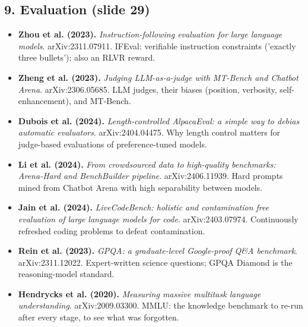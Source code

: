 \documentclass[11pt,letterpaper]{article}
\begin{document}
\subsection*{9. Evaluation (slide 29)}
\begin{itemize}[leftmargin=1.2em,itemsep=3pt]\sloppy
\item \textbf{Zhou et al. (2023).} \textit{Instruction-following evaluation for large language models}. arXiv:2311.07911. IFEval: verifiable instruction constraints ('exactly three bullets'); also an RLVR reward.
\item \textbf{Zheng et al. (2023).} \textit{Judging LLM-as-a-judge with MT-Bench and Chatbot Arena}. arXiv:2306.05685. LLM judges, their biases (position, verbosity, self-enhancement), and MT-Bench.
\item \textbf{Dubois et al. (2024).} \textit{Length-controlled AlpacaEval: a simple way to debias automatic evaluators}. arXiv:2404.04475. Why length control matters for judge-based evaluations of preference-tuned models.
\item \textbf{Li et al. (2024).} \textit{From crowdsourced data to high-quality benchmarks: Arena-Hard and BenchBuilder pipeline}. arXiv:2406.11939. Hard prompts mined from Chatbot Arena with high separability between models.
\item \textbf{Jain et al. (2024).} \textit{LiveCodeBench: holistic and contamination free evaluation of large language models for code}. arXiv:2403.07974. Continuously refreshed coding problems to defeat contamination.
\item \textbf{Rein et al. (2023).} \textit{GPQA: a graduate-level Google-proof Q\&A benchmark}. arXiv:2311.12022. Expert-written science questions; GPQA Diamond is the reasoning-model standard.
\item \textbf{Hendrycks et al. (2020).} \textit{Measuring massive multitask language understanding}. arXiv:2009.03300. MMLU: the knowledge benchmark to re-run after every stage, to see what was forgotten.
\end{itemize}
\clearpage
\printindex
\end{document}
